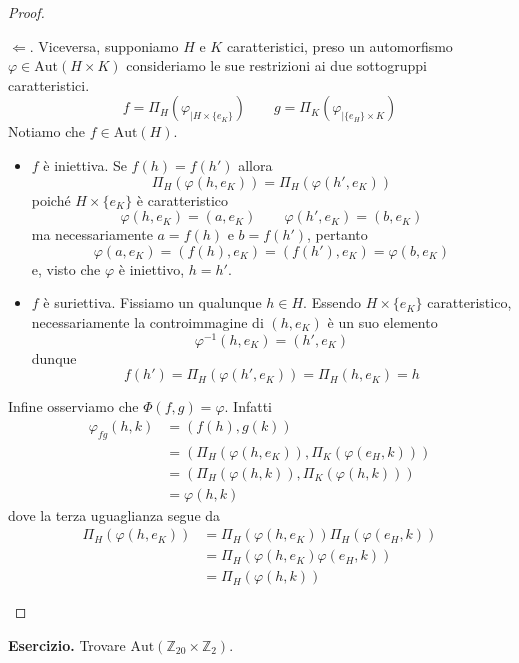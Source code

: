 \documentclass[a4paper]{article}
\theoremstyle{remark}
\theoremstyle{definition}
\newcommand{\Aut}[1]{\mathrm{Aut}\left( #1 \right)}
\begin{document}
\begin{multicols}{2}
\begin{proof}
\begin{itemize}
		$ \Leftarrow $. Viceversa, supponiamo $ H $ e $ K $ caratteristici, preso un automorfismo $ \varphi \in \Aut{H \times K}$ consideriamo le sue restrizioni ai due sottogruppi caratteristici.
		\[ f = \Pi_H \left( \varphi_{|H\times\{e_K\}} \right) \qquad g = \Pi_K \left( \varphi_{|\{e_H\}\times K} \right) \]
		Notiamo che $ f \in \Aut{H} $.
		\begin{itemize}
			\item $ f $ è iniettiva. Se $ f(h) = f(h') $ allora \[\Pi_H \left( \varphi(h, e_K) \right) = \Pi_H \left( \varphi(h', e_K) \right) \]
			poiché $ H\times\{e_K\} $ è caratteristico \[ \varphi(h, e_K) = (a, e_K) \qquad   \varphi(h', e_K) = (b, e_K) \]
			ma necessariamente $ a = f(h) $ e $ b = f(h') $, pertanto
			\[ \varphi(a, e_K) = (f(h), e_K) = (f(h'), e_K) = \varphi(b, e_K) \]
			e, visto che $ \varphi $ è iniettivo, $ h = h' $.
			\item $ f $ è suriettiva. Fissiamo un qualunque $ h \in H $. Essendo $ H\times\{e_K\} $ caratteristico, necessariamente la controimmagine di $ (h, e_K) $ è un suo elemento \[ \varphi^{-1}(h, e_K) = (h', e_K) \]
			dunque \[ f(h') =\Pi_H \left( \varphi(h', e_K) \right) = \Pi_H \left( h, e_K \right) = h \]
		\end{itemize}
		Infine osserviamo che $ \Phi(f, g) = \varphi $. Infatti
		\begin{align*} \varphi_{fg}(h, k) &= \left(f(h), g(k)\right)\\& = \left(\Pi_H \left( \varphi(h, e_K) \right), \Pi_K \left( \varphi(e_H, k) \right)\right) \\& =
		\left(\Pi_H \left( \varphi(h, k) \right), \Pi_K \left( \varphi(h, k) \right)\right) \\& =
		 \varphi(h, k) \end{align*}
		 dove la terza uguaglianza segue da
		 \begin{align*}
		 \Pi_H \left( \varphi(h, e_K) \right) &= \Pi_H \left( \varphi(h, e_K) \right)\Pi_H(\varphi(e_H, k)) \\
		 &= \Pi_H \left( \varphi(h, e_K)\varphi(e_H, k)\right) \\&= \Pi_H \left( \varphi(h, k)\right)
		 \end{align*}
	\end{itemize}
\end{proof}

\textbf{Esercizio.} Trovare $ \Aut{\mathbb{Z}_{20} \times \mathbb{Z}_{2} } $.
\end{multicols}
\end{document}
